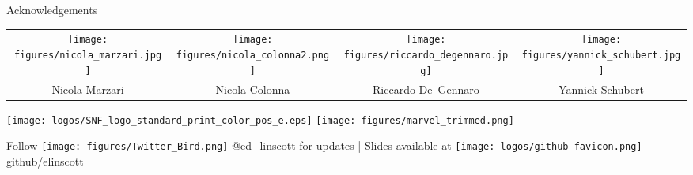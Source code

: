 \documentclass[xcolor=table,aspectratio=169]{beamer}
\numberwithin{equation}{section}
\begin{document}
\begin{frame}{Acknowledgements}

   \begin{center}
      \footnotesize
      \begin{tabularx}{\textwidth}{CCCC}
         \texttt{[image: figures/nicola\_marzari.jpg]}     &
         \texttt{[image: figures/nicola\_colonna2.png]}    &
         \texttt{[image: figures/riccardo\_degennaro.jpg]} &
         \texttt{[image: figures/yannick\_schubert.jpg]}     \\
         Nicola Marzari                                                             &
         Nicola Colonna                                                             &
         Riccardo De~Gennaro                                                        &
         Yannick Schubert                                                             \\
      \end{tabularx}
   \end{center}
   \begin{center}
      \texttt{[image: logos/SNF\_logo\_standard\_print\_color\_pos\_e.eps]}
      \hspace{1em}
      \texttt{[image: figures/marvel\_trimmed.png]}
   \end{center}

   \vspace{1ex}
   \begin{center}
      Follow \texttt{[image: figures/Twitter\_Bird.png]} \textcolor{twitter_blue}{@ed\_linscott} for updates | Slides available at \texttt{[image: logos/github-favicon.png]} github/elinscott
   \end{center}


   \vspace{2ex}
   \scriptsize


   \vspace{2ex}
   \scriptsize
\end{frame}
\end{document}
